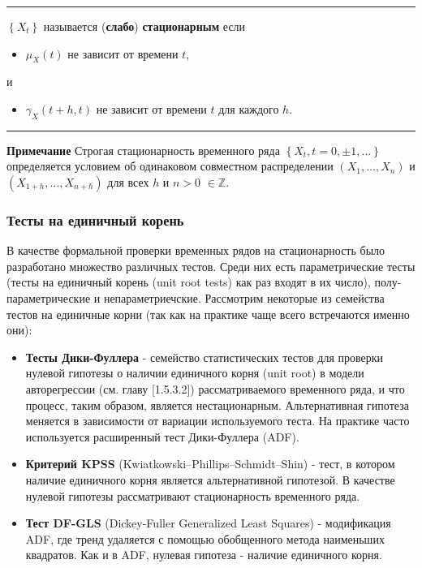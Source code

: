 \noindent\rule{\linewidth}{0.1mm}

\begin{definition}
    $\left\{ X_t \right\}$ называется (\textbf{слабо}) 
    \textbf{стационарным} если
    \begin{itemize}
        \item $\mu_X(t)$ не зависит от времени $t$,
    \end{itemize}
    \vspace{-10pt}
    и 
    \vspace{-10pt}
    \begin{itemize}
        \item $\gamma_X(t+h, t)$ не зависит от времени $t$ для каждого $h$.
    \end{itemize}
    \noindent\rule{\linewidth}{0.1mm}
\end{definition}

\noindent\textbf{Примечание} Строгая стационарность временного ряда $\left\{ 
X_t, t = 0, \pm 1, \dots \right\}$ определяется условием об одинаковом 
совместном распределении
$ \left( X_1, \dots, X_n \right) $ и $ \left( X_{1+h}, \dots, X_{n+h} \right) $ 
для всех $h$ и $n > 0$ $\in \mathbb{Z}$.

\subsubsection{Тесты на единичный корень}

В качестве формальной проверки временных рядов на стационарность было 
разработано множество различных тестов. Среди них есть 
параметрические тесты (тесты на единичный корень (unit root tests) как 
раз входят в их число), полу-параметрические и непараметриечские. 
Рассмотрим некоторые из семейства тестов на единичные корни (так как 
на практике чаще всего встречаются именно они):

\begin{itemize}
    \item \textbf{Тесты Дики-Фуллера} - семейство статистических тестов для проверки 
    нулевой гипотезы о наличии единичного корня (unit root) в модели авторегрессии 
    (см. главу [1.5.3.2]) рассматриваемого временного ряда, и что процесс, таким образом, 
    является нестационарным. Альтернативная гипотеза меняется в зависимости от 
    вариации используемого теста. На практике часто используется расширенный 
    тест Дики-Фуллера (ADF).

    \item \textbf{Критерий KPSS} (Kwiatkowski–Phillips–Schmidt–Shin) - тест, 
    в котором наличие единичного корня является альтернативной гипотезой. 
    В качестве нулевой гипотезы рассматривают стационарность временного ряда.
    
    \item  \textbf{Тест DF-GLS} (Dickey-Fuller Generalized Least Squares) - 
    модификация ADF, где тренд удаляется с помощью 
    обобщенного метода наименьших квадратов. Как и в ADF, 
    нулевая гипотеза - наличие единичного корня.
\end{itemize}

